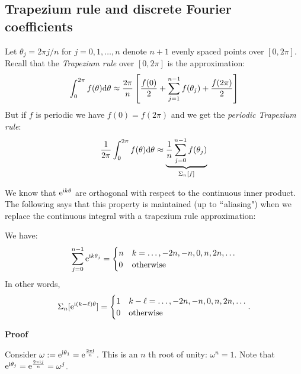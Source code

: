 \subsection{Trapezium rule and discrete Fourier coefficients}
\begin{definition} Let $\ensuremath{\theta}_j = 2\ensuremath{\pi}j/n$ for $j = 0,1,\ensuremath{\ldots},n$ denote $n+1$ evenly spaced points over $[0,2\ensuremath{\pi}]$. Recall that the \emph{Trapezium rule} over $[0,2\ensuremath{\pi}]$ is the approximation:
\[
\ensuremath{\int}_0^{2\ensuremath{\pi}} f(\ensuremath{\theta}) {\rm d}\ensuremath{\theta} \ensuremath{\approx} {2 \ensuremath{\pi} \over n} \left[{f(0) \over 2} + \ensuremath{\sum}_{j=1}^{n-1} f(\ensuremath{\theta}_j) + {f(2 \ensuremath{\pi}) \over 2} \right]
\]
But if $f$ is periodic we have $f(0) = f(2\ensuremath{\pi})$ and we get the \emph{periodic Trapezium rule}:
\[
{1 \over 2\ensuremath{\pi}} \ensuremath{\int}_0^{2\ensuremath{\pi}} f(\ensuremath{\theta}) {\rm d}\ensuremath{\theta} \ensuremath{\approx} \underbrace{{1 \over n} \ensuremath{\sum}_{j=0}^{n-1} f(\ensuremath{\theta}_j)}_{\ensuremath{\Sigma}_n[f]}
\]
\end{definition}

We know that ${\rm e}^{{\rm i} k \ensuremath{\theta}}$ are orthogonal with respect to the continuous inner product. The following says that this property is maintained (up to \ensuremath{\ldq}aliasing") when we replace the continuous integral with a trapezium rule approximation:

\begin{lemma} We have:
\[
\ensuremath{\sum}_{j=0}^{n-1} {\rm e}^{{\rm i} k \ensuremath{\theta}_j} =
\begin{cases} n & k = \ldots,-2n,-n,0,n,2n,\ldots  \cr
              0 & \hbox{otherwise}
\end{cases}
\]
In other words,
\[
\ensuremath{\Sigma}_n[{\rm e}^{{\rm i} (k-\ensuremath{\ell}) \ensuremath{\theta}}] =
\begin{cases} 1 & k-\ensuremath{\ell} = \ldots,-2n,-n,0,n,2n,\ldots  \cr
              0 & \hbox{otherwise}
\end{cases}.
\]
\end{lemma}
\textbf{Proof}

Consider $\ensuremath{\omega} := {\rm e}^{{\rm i} \ensuremath{\theta}_1} = {\rm e}^{2 \ensuremath{\pi} {\rm i} \over n}$. This is an $n$ th root of unity: $\ensuremath{\omega}^n = 1$. Note that ${\rm e}^{{\rm i} \ensuremath{\theta}_j} ={\rm e}^{2 \ensuremath{\pi} {\rm i} j \over n}= \ensuremath{\omega}^j$.

